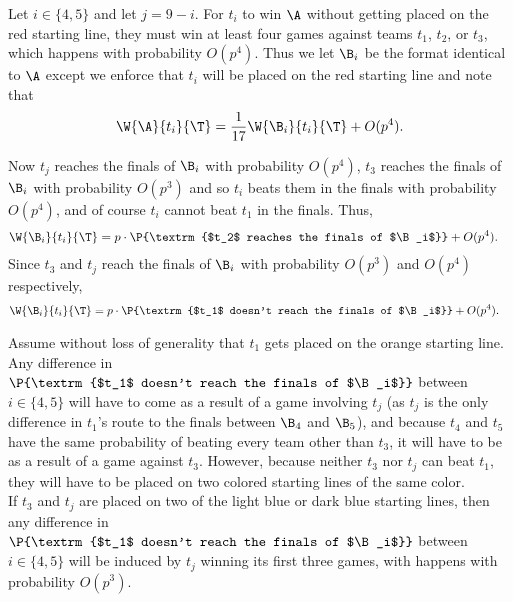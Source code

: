 {{        Let $i \in \{4, 5\}$ and let $j = 9-i.$ For $t_i$ to win $\A$ without getting placed on the red starting line, they must win at least four games against teams $t_1$, $t_2$, or $t_3$, which happens with probability $O(p^4).$ Thus we let $\B_i$ be the format identical to $\A$ except we enforce that $t_i$ will be placed on the red starting line and note that
        $$\W{\A}{t_i}{\T} = \frac{1}{17}\W{\B_i}{t_i}{\T} + O(p^4).$$
        
        Now $t_j$ reaches the finals of $\B_i$ with probability $O(p^4)$, $t_3$ reaches the finals of $\B_i$ with probability $O(p^3)$ and so $t_i$ beats them in the finals with probability $O(p^4)$, and of course $t_i$ cannot beat $t_1$ in the finals. Thus,
        \begin{align*}
            \W{\B_i}{t_i}{\T} &= p \cdot \P{\textrm{$t_2$ reaches the finals of $\B_i$}} + O(p^4).
        \end{align*}
        Since $t_3$ and $t_j$ reach the finals of $\B_i$ with probability $O(p^3)$ and $O(p^4)$ respectively,
        \begin{align*}
            \W{\B_i}{t_i}{\T} &= p \cdot \P{\textrm{$t_1$ doesn't reach the finals of $\B_i$}} + O(p^4).
        \end{align*}

        Assume without loss of generality that $t_1$ gets placed on the orange starting line.\\

        Any difference in $\P{\textrm{$t_1$ doesn't reach the finals of $\B_i$}}$ between $i \in \{4, 5\}$ will have to come as a result of a game involving $t_j$ (as $t_j$ is the only difference in $t_1$'s route to the finals between $\B_4$ and $\B_5$), and because $t_4$ and $t_5$ have the same probability of beating every team other than $t_3$, it will have to be as a result of a game against $t_3.$ However, because neither $t_3$ nor $t_j$ can beat $t_1$, they will have to be placed on two colored starting lines of the same color.\\

        If $t_3$ and $t_j$ are placed on two of the light blue or dark blue starting lines, then any difference in $\P{\textrm{$t_1$ doesn't reach the finals of $\B_i$}}$ between $i \in \{4, 5\}$ will be induced by $t_j$ winning its first three games, with happens with probability $O(p^3).$\\

}}
